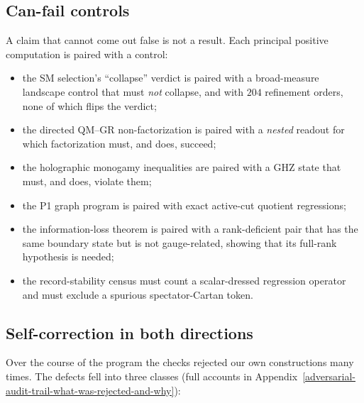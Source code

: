 \subsection{Can-fail controls}\label{can-fail-controls}

A claim that cannot come out false is not a result. Each principal positive computation is paired with a control:

\begin{itemize}\tightlist
\item the SM selection's ``collapse'' verdict is paired with a broad-measure landscape control that must \emph{not}
  collapse, and with \(204\) refinement orders, none of which flips the verdict;
\item the directed QM--GR non-factorization is paired with a \emph{nested} readout for which factorization must, and
  does, succeed;
\item the holographic monogamy inequalities are paired with a GHZ state that must, and does, violate them;
\item the P1 graph program is paired with exact active-cut quotient regressions;
\item the information-loss theorem is paired with a rank-deficient pair that has the same boundary state but is not
  gauge-related, showing that its full-rank hypothesis is needed;
\item the record-stability census must count a scalar-dressed regression operator and must exclude a spurious
  spectator-Cartan token.
\end{itemize}

\subsection{Self-correction in both directions}\label{adversarial-self-correction-in-both-directions}

Over the course of the program the checks rejected our own constructions many times. The defects fell into three
classes (full accounts in Appendix~\ref{adversarial-audit-trail-what-was-rejected-and-why}):


